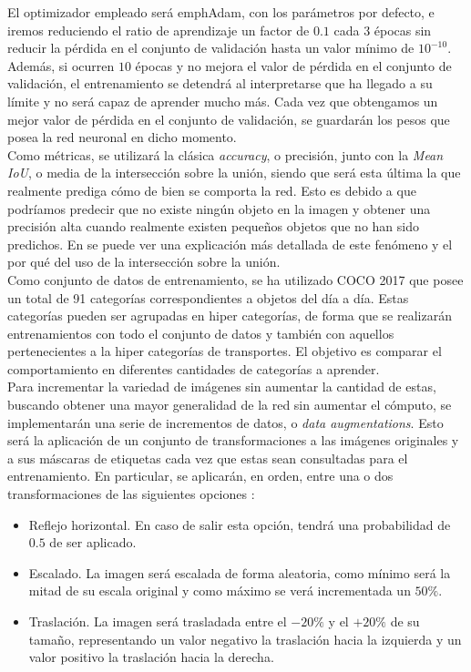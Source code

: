 El optimizador empleado será emph{Adam}, con los parámetros por defecto, e iremos reduciendo el ratio de aprendizaje un factor de $0.1$ cada $3$ épocas sin reducir la pérdida en el conjunto de validación hasta un valor mínimo de $10^{-10}$. Además, si ocurren $10$ épocas y no mejora el valor de pérdida en el conjunto de validación, el entrenamiento se detendrá al interpretarse que ha llegado a su límite y no será capaz de aprender mucho más. Cada vez que obtengamos un mejor valor de pérdida en el conjunto de validación, se guardarán los pesos que posea la red neuronal en dicho momento.\\

Como métricas, se utilizará la clásica \emph{accuracy}, o precisión, junto con la \emph{Mean IoU}, o media de la intersección sobre la unión, siendo que será esta última la que realmente prediga cómo de bien se comporta la red. Esto es debido a que podríamos predecir que no existe ningún objeto en la imagen y obtener una precisión alta cuando realmente existen pequeños objetos que no han sido predichos. En \cite{accvsiou} se puede ver una explicación más detallada de este fenómeno y el por qué del uso de la intersección sobre la unión. \\


Como conjunto de datos de entrenamiento, se ha utilizado COCO 2017 \cite{2014arXiv1405.0312L} \cite{COCO} que posee un total de 91 categorías correspondientes a objetos del día a día. Estas categorías pueden ser agrupadas en hiper categorías, de forma que se realizarán entrenamientos con todo el conjunto de datos y también con aquellos pertenecientes a la hiper categorías de transportes. El objetivo es comparar el comportamiento en diferentes cantidades de categorías a aprender.\\

Para incrementar la variedad de imágenes sin aumentar la cantidad de estas, buscando obtener una mayor generalidad de la red sin aumentar el cómputo, se implementarán una serie de incrementos de datos, o \emph{data augmentations}. Esto será la aplicación de un conjunto de transformaciones a las imágenes originales y a sus máscaras de etiquetas cada vez que estas sean consultadas para el entrenamiento. En particular, se aplicarán, en orden, entre una o dos transformaciones de las siguientes opciones \cite{imgaug}: \\
\begin{itemize}
\item Reflejo horizontal. En caso  de salir esta opción, tendrá una probabilidad de $0.5$ de ser aplicado.
\item Escalado. La imagen será escalada de forma aleatoria, como mínimo será la mitad de su escala original y como máximo se verá incrementada un $50\%$.
\item Traslación. La imagen será trasladada entre el $-20\%$ y el $+20\%$ de su tamaño, representando un valor negativo la traslación hacia la izquierda y un valor positivo la traslación hacia la derecha.
\end{itemize}

